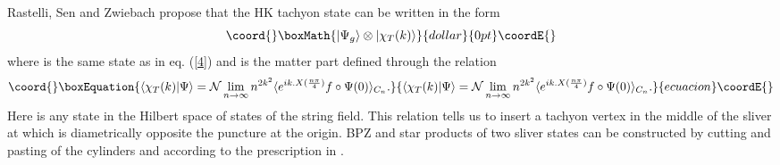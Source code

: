 \documentclass[a4paper,12pt]{article}
\begin{document}
Rastelli, Sen and Zwiebach propose that the HK tachyon state can be written
in the form
$$\coord{}\boxMath{
|\Psi_g\rangle\otimes|\chi_T(k)\rangle
}{dollar}{0pt}\coordE{}$$
where \coordHE{} is the same state as in eq. (\ref{4}) and
\coordHE{} is the matter part defined through the
relation
\begin{equation}\coord{}\boxEquation{
\langle\chi_T(k)|\Psi\rangle=\mathcal{N}\lim_{n\to\infty} n^{2k^2}
\langle e^{ik.X(\frac{n\pi}{4})}f\circ\Psi(0)\rangle_{C_n} .
\label{def}
}{
\langle\chi_T(k)|\Psi\rangle=\mathcal{N}\lim_{n\to\infty} n^{2k^2}
\langle e^{ik.X(\frac{n\pi}{4})}f\circ\Psi(0)\rangle_{C_n} .
}{ecuacion}\coordE{}\end{equation}
Here  \myHighlight{$|\Psi\rangle$}\coordHE{} is any state in the Hilbert space of states of the
string field.
This relation tells us to insert a tachyon vertex in the middle of the
sliver at \coordHE{} which is diametrically opposite the puncture at the origin.
BPZ and star products of two sliver states can be constructed by cutting
and pasting of the cylinders \coordHE{} and \coordHE{} according to the
prescription in \cite{rsz2,rsz5}.
\end{document}

